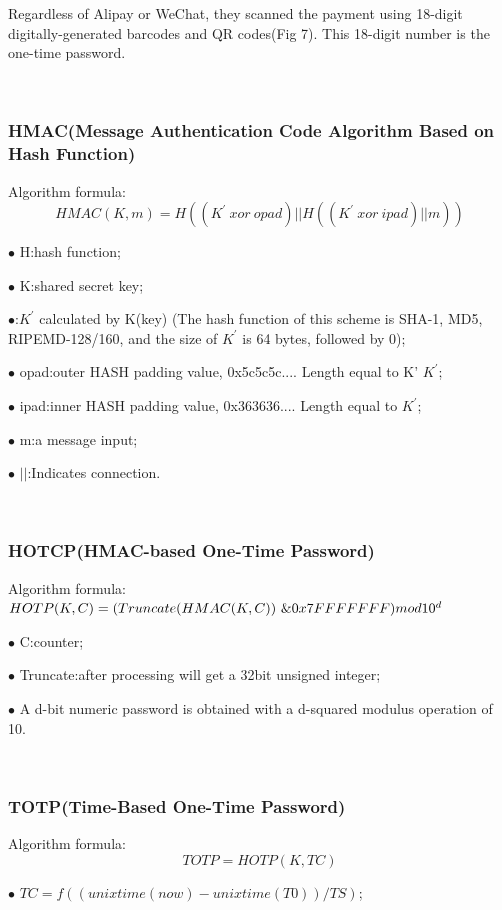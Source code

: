 \documentclass[journal]{IEEEtran}
\begin{document}
Regardless of Alipay or WeChat, they scanned the payment using 18-digit digitally-generated barcodes and QR codes(Fig 7). This 18-digit number is the one-time password. 

\

\subsubsection{HMAC(Message Authentication Code Algorithm Based on Hash Function)}
Algorithm formula:
$$HMAC(K, m) = H((K^{\prime}~xor~opad) || H ((K^{\prime}~xor~ipad) || m)) $$

$\bullet$ H:hash function;

$\bullet$ K:shared secret key;

$\bullet$:$K^{\prime}$ calculated by K(key) (The hash function of this scheme is SHA-1, MD5, RIPEMD-128/160, and the size of $K^{\prime}$ is 64 bytes, followed by 0);


$\bullet$ opad:outer HASH padding value, 0x5c5c5c.... Length equal to K’ $K^{\prime}$;

$\bullet$ ipad:inner HASH padding value, 0x363636.... Length equal to  $K^{\prime}$;

$\bullet$ m:a message input;

$\bullet$ $||$:Indicates connection.

\

\subsubsection{HOTCP(HMAC-based One-Time Password)}
Algorithm formula:
\\
$HOTP(K,C) = (Truncate(HMAC(K,C)) ~\& 
\\0x7FFFFFFF)mod 10^{d}$

$\bullet$ C:counter;

$\bullet$ Truncate:after processing will get a 32bit unsigned integer;

$\bullet$ A d-bit numeric password is obtained with a d-squared modulus operation of 10.

\

\subsubsection{TOTP(Time-Based One-Time Password)}


Algorithm formula:
\\
$$TOTP = HOTP(K, TC)$$

$\bullet$ $TC=f((unixtime(now)-unixtime(T0)) / TS)$;
\end{document}
